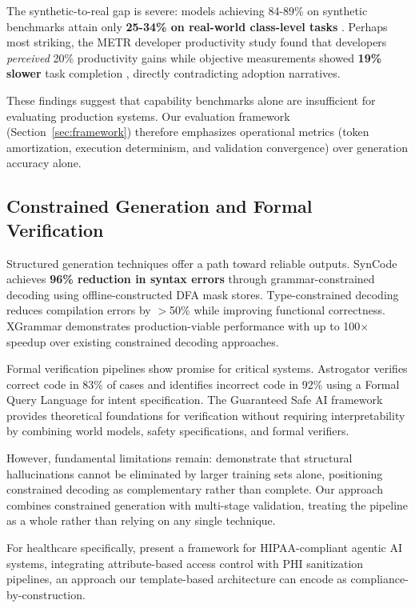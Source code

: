 \documentclass[11pt]{article}
\begin{document}
The synthetic-to-real gap is severe: models achieving 84-89\% on synthetic benchmarks attain only \textbf{25-34\% on real-world class-level tasks} \citep{rao2025synthetic}. Perhaps most striking, the METR developer productivity study found that developers \emph{perceived} 20\% productivity gains while objective measurements showed \textbf{19\% slower} task completion \citep{metr2025productivity}, directly contradicting adoption narratives.

These findings suggest that capability benchmarks alone are insufficient for evaluating production systems. Our evaluation framework (Section~\ref{sec:framework}) therefore emphasizes operational metrics (token amortization, execution determinism, and validation convergence) over generation accuracy alone.

\subsection{Constrained Generation and Formal Verification}

Structured generation techniques offer a path toward reliable outputs. SynCode \citep{ugare2024syncode} achieves \textbf{96\% reduction in syntax errors} through grammar-constrained decoding using offline-constructed DFA mask stores. Type-constrained decoding \citep{mundler2025typeconstrained} reduces compilation errors by $>$50\% while improving functional correctness. XGrammar \citep{dong2024xgrammar} demonstrates production-viable performance with up to 100$\times$ speedup over existing constrained decoding approaches.

Formal verification pipelines show promise for critical systems. Astrogator \citep{councilman2025astrogator} verifies correct code in 83\% of cases and identifies incorrect code in 92\% using a Formal Query Language for intent specification. The Guaranteed Safe AI framework \citep{dalrymple2024guaranteed} provides theoretical foundations for verification without requiring interpretability by combining world models, safety specifications, and formal verifiers.

However, fundamental limitations remain: \citet{xu2024hallucination} demonstrate that structural hallucinations cannot be eliminated by larger training sets alone, positioning constrained decoding as complementary rather than complete. Our approach combines constrained generation with multi-stage validation, treating the pipeline as a whole rather than relying on any single technique.

For healthcare specifically, \citet{neupane2025hipaa} present a framework for HIPAA-compliant agentic AI systems, integrating attribute-based access control with PHI sanitization pipelines, an approach our template-based architecture can encode as compliance-by-construction.
\end{document}
